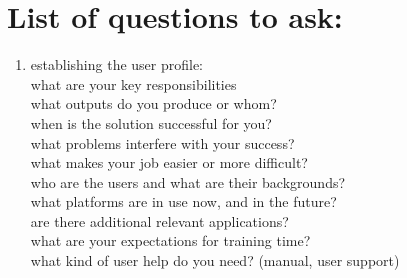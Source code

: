 \documentclass[letterpaper]{article}
\begin{document}
\section{List of questions to ask:}
\begin{enumerate}
 \item establishing the user profile:\\
       what are your key responsibilities\\
       what outputs do you produce or whom?\\
       when is the solution successful for you?\\
       what problems interfere with your success?\\
       what makes your job easier or more difficult?\\
       who are the users and what are their backgrounds?\\
       what platforms are in use now, and in the future?\\
       are there additional relevant applications?\\
       what are your expectations for training time?\\
       what kind of user help do you need? (manual, user support)
       

\end{enumerate}
\end{document}
